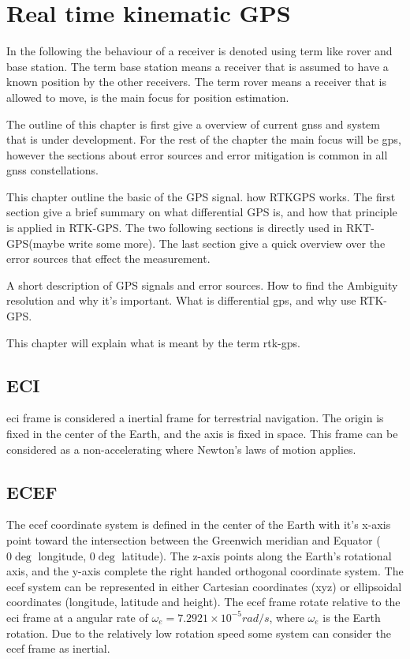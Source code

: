 
\chapter{Real time kinematic GPS}

In the following the behaviour of a receiver is denoted using term like rover and base station. The term base station means a receiver that is assumed to have a known position by the other receivers. The term rover means a receiver that is allowed to move, is the main focus for position estimation.

The outline of this chapter is first give a overview of current \gls{gnss} and system that is under development. For the rest of the chapter the main focus will be \gls{gps}, however the sections about error sources and error mitigation is common in all \gls{gnss} constellations. 



This chapter outline the basic of the GPS signal. how RTKGPS works. The first section give a brief summary on what differential GPS is, and how that principle is applied in RTK-GPS. The two following sections is directly used in RKT-GPS(maybe write some more). The last section give a quick overview over the error sources that effect the measurement.



A short description of GPS signals and error sources. How to find the Ambiguity resolution and why it's important. What is differential gps, and why use RTK-GPS.


This chapter will explain what is meant by the term rtk-gps.


\section{ECI}
\gls{eci} frame is considered a inertial frame for terrestrial navigation. The origin is fixed in the center of the Earth, and the axis is fixed in space. This frame can be considered as a non-accelerating where Newton's laws of motion applies. 
\section{ECEF}
The \gls{ecef} coordinate system is defined in the center of the Earth with it's x-axis point toward the intersection between the Greenwich meridian and Equator ( $0\deg $ longitude, $0\deg $ latitude). The z-axis points along the Earth's rotational axis, and the y-axis complete the right handed orthogonal coordinate system. The \gls{ecef} system can be represented in either Cartesian coordinates (xyz) or ellipsoidal coordinates (longitude, latitude and height). The \gls{ecef} frame rotate relative to the \gls{eci} frame at a angular rate of $\omega_e = 7.2921 \times 10^{-5}rad/s$, where $\omega_e$ is the Earth rotation. Due to the relatively low rotation speed some system can consider the \gls{ecef} frame as inertial.
